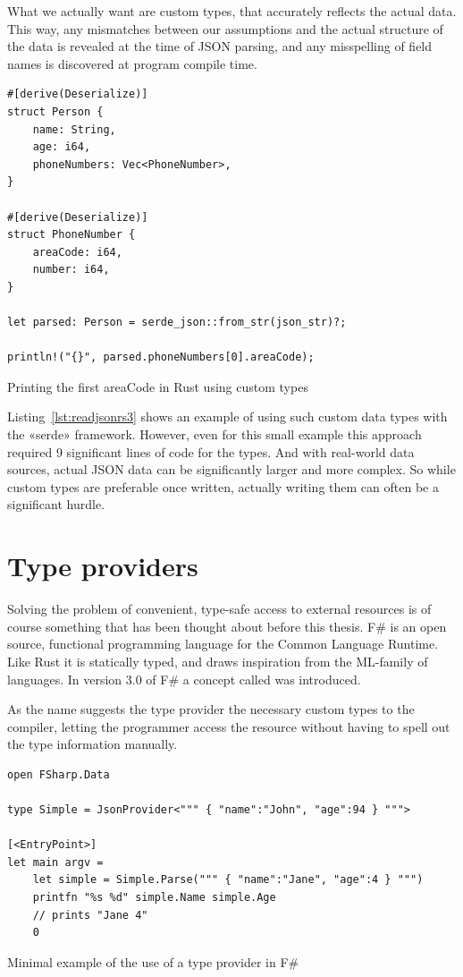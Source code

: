 What we actually want are custom types, that accurately reflects the actual data. This way, any mismatches between our assumptions and the actual structure of the data is revealed at the time of JSON parsing, and any misspelling of field names is discovered at program compile time.

\begin{listing}[ht!]
\begin{verbatim}
#[derive(Deserialize)]
struct Person {
    name: String,
    age: i64,
    phoneNumbers: Vec<PhoneNumber>,
}

#[derive(Deserialize)]
struct PhoneNumber {
    areaCode: i64,
    number: i64,
}

let parsed: Person = serde_json::from_str(json_str)?;

println!("{}", parsed.phoneNumbers[0].areaCode);
\end{verbatim}
\caption{Printing the first areaCode in Rust using custom types}
\label{lst:readjsonrs3}
\end{listing}

Listing~\ref{lst:readjsonrs3} shows an example of using such custom data types with the «serde» framework. However, even for this small example this approach required 9 significant lines of code for the types. And with real-world data sources, actual JSON data can be significantly larger and more complex. So while custom types are preferable once written, actually writing them can often be a significant hurdle.

\section{Type providers}
\label{sec:type-providers}

Solving the problem of convenient, type-safe access to external resources is of course something that has been thought about before this thesis. F\# is an open source, functional programming language for the Common Language Runtime. Like Rust it is statically typed, and draws inspiration from the ML-family of languages. In version 3.0 of F\# a concept called  was introduced.

As the name suggests the type provider  the necessary custom types to the compiler, letting the programmer access the resource without having to spell out the type information manually.

\begin{listing}[ht!]
\begin{verbatim}
open FSharp.Data

type Simple = JsonProvider<""" { "name":"John", "age":94 } """>

[<EntryPoint>]
let main argv =
    let simple = Simple.Parse(""" { "name":"Jane", "age":4 } """)
    printfn "%s %d" simple.Name simple.Age
    // prints "Jane 4"
    0
\end{verbatim}
\caption{Minimal example of the use of a type provider in F\#}
\label{lst:fsharpsample}
\end{listing}

